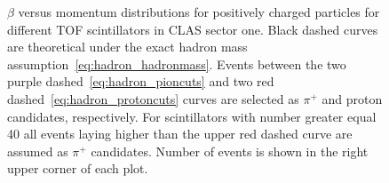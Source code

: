 \begin{figure}[htp]
\begin{center}
\caption{\small  $\beta$ versus momentum distributions for positively charged particles for different TOF scintillators in CLAS sector one. Black dashed curves are theoretical under the exact hadron mass assumption~\ref{eq:hadron_hadronmass}. Events between the two purple dashed~\ref{eq:hadron_pioncuts} and two red dashed~\ref{eq:hadron_protoncuts} curves are selected as $\pi^{+}$ and proton candidates, respectively. For scintillators with number greater equal 40 all events laying higher than the upper red dashed curve are assumed as $\pi^{+}$ candidates. Number of events is shown in the right upper corner of each plot. \label{fig:b_vs_p_positive}} 
\end{center}
\end{figure}




